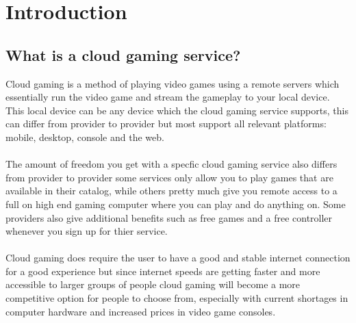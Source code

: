 \section{Introduction}

\subsection{What is a cloud gaming service?}
Cloud gaming is a method of playing video games using a remote servers which essentially run the video game and stream the gameplay to your local device.
This local device can be any device which the cloud gaming service supports,
this can differ from provider to provider but most support all relevant platforms: mobile, desktop, console and the web. \\\\ 
The amount of freedom you get with a specfic cloud gaming service also differs from provider to provider some services only allow you to play games that are available in their catalog, while others pretty much give you remote access to a full on high end gaming computer where you can play and do anything on. Some providers also give additional benefits such as free games and a free controller whenever you sign up for thier service.\\\\
Cloud gaming does require the user to have a good and stable internet connection for a good experience but since internet speeds are getting faster and more accessible to larger groups of people cloud gaming will become a more competitive option for people to choose from, especially with current shortages in computer hardware and increased prices in video game consoles.  

